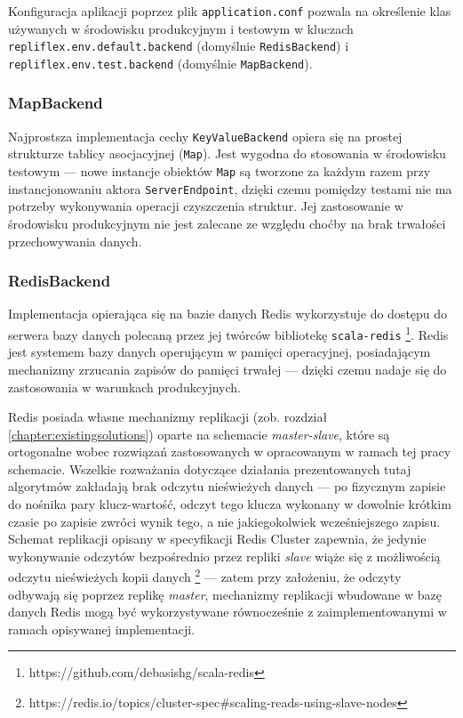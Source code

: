 Konfiguracja aplikacji poprzez plik \texttt{application.conf} pozwala na określenie klas używanych w środowisku produkcyjnym i testowym w kluczach \texttt{repliflex.env.default.backend} (domyślnie \texttt{RedisBackend}) i \texttt{repliflex.env.test.backend} (domyślnie \texttt{MapBackend}).

\subsubsection{MapBackend} \label{mapbackend}

Najprostsza implementacja cechy \texttt{KeyValueBackend} opiera się na prostej strukturze tablicy asocjacyjnej (\texttt{Map}). Jest wygodna do stosowania w środowisku testowym --- nowe instancje obiektów \texttt{Map} są tworzone za każdym razem przy instancjonowaniu aktora \texttt{ServerEndpoint}, dzięki czemu pomiędzy testami nie ma potrzeby wykonywania operacji czyszczenia struktur. Jej zastosowanie w środowisku produkcyjnym nie jest zalecane ze względu choćby na brak trwałości przechowywania danych.

\subsubsection{RedisBackend} \label{redisbackend}

Implementacja opierająca się na bazie danych Redis wykorzystuje do dostępu do serwera bazy danych polecaną przez jej twórców bibliotekę \texttt{scala-redis} \footnote{https://github.com/debasishg/scala-redis}. Redis jest systemem bazy danych operującym w pamięci operacyjnej, posiadającym mechanizmy zrzucania zapisów do pamięci trwałej --- dzięki czemu nadaje się do zastosowania w warunkach produkcyjnych.

Redis posiada własne mechanizmy replikacji (zob. rozdział \ref{chapter:existingsolutions}) oparte na schemacie \textit{master-slave}, które są ortogonalne wobec rozwiązań zastosowanych w opracowanym w ramach tej pracy schemacie. Wszelkie rozważania dotyczące działania prezentowanych tutaj algorytmów zakładają brak odczytu nieświeżych danych --- po fizycznym zapisie do nośnika pary klucz-wartość, odczyt tego klucza wykonany w dowolnie krótkim czasie po zapisie zwróci wynik tego, a nie jakiegokolwiek wcześniejszego zapisu. Schemat replikacji opisany w specyfikacji Redis Cluster zapewnia, że jedynie wykonywanie odczytów bezpośrednio przez repliki \textit{slave} wiąże się z możliwością odczytu nieświeżych kopii danych \footnote{https://redis.io/topics/cluster-spec\#scaling-reads-using-slave-nodes} --- zatem przy założeniu, że odczyty odbywają się poprzez replikę \textit{master}, mechanizmy replikacji wbudowane w bazę danych Redis mogą być wykorzystywane równocześnie z zaimplementowanymi w ramach opisywanej implementacji.

